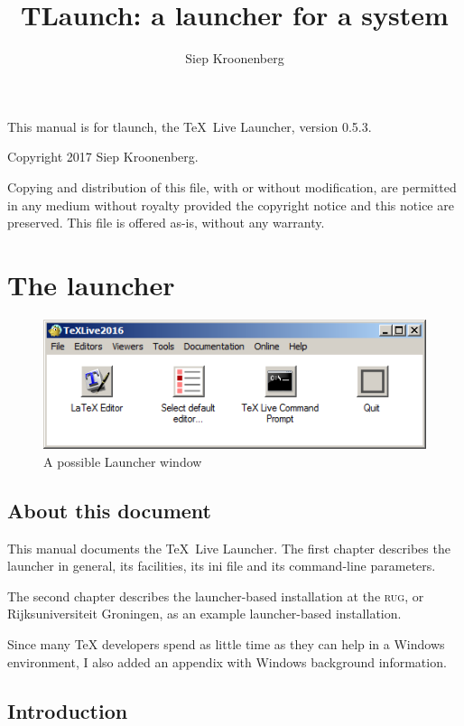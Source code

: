 \documentclass[11pt,a4paper,oneside]{report}
\title{TLaunch: a launcher for a \TL{} system}
\author{Siep Kroonenberg}
\def\TL{\TeX~Live}
\def\mysc#1{{\rmfamily\textsc{#1}}}
\def\RUG{\mysc{rug}}
\begin{document}
\maketitle
\clearpage
\thispagestyle{empty}
\null\vfill
{\small\parindent=0pt
This manual is for tlaunch, the \TL{} Launcher, version 0.5.3.

Copyright \textcopyright{} 2017 Siep Kroonenberg.

Copying and distribution of this file, with or without modification,
are permitted in any medium without royalty provided the copyright
notice and this notice are preserved. This file is offered as-is,
without any warranty.\par}
\clearpage
\thispagestyle{empty}
\setcounter{page}{3}
\tableofcontents

\chapter{The launcher}
\label{chap:launcher}

\begin{figure}
  \centering
  \includegraphics[width=.7\linewidth]{figures/tlaunch_window}
  \caption{A possible Launcher window}
  \label{fig:launcher}
\end{figure}

\section*{About this document}

This manual documents the \TL{} Launcher. The first chapter
describes the launcher in general, its facilities, its ini file and
its command-line parameters.

The second chapter describes the launcher-based installation at the
\RUG, or Rijksuniversiteit Groningen, as an example
launcher-based installation.

Since many \TeX{} developers spend as little time as they can help
in a Windows environment, I also added an appendix with Windows
background information.

\section{Introduction}
\label{sec:intro}
\end{document}
